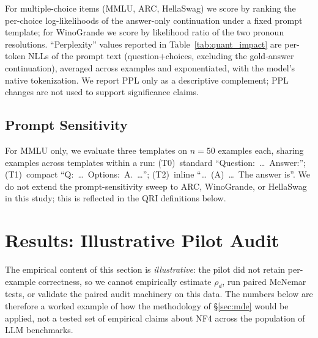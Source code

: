 \documentclass{article}
\begin{document}
For multiple-choice items (MMLU, ARC, HellaSwag) we score by ranking the per-choice log-likelihoods of the answer-only continuation under a fixed prompt template; for WinoGrande we score by likelihood ratio of the two pronoun resolutions. ``Perplexity'' values reported in Table~\ref{tab:quant_impact} are per-token NLLs of the prompt text (question$+$choices, excluding the gold-answer continuation), averaged across examples and exponentiated, with the model's native tokenization. We report PPL only as a descriptive complement; PPL changes are not used to support significance claims.

\subsection{Prompt Sensitivity}

For MMLU only, we evaluate three templates on $n{=}50$ examples each, sharing examples across templates within a run: (T0)~standard ``Question:~\ldots~Answer:''; (T1)~compact ``Q:~\ldots~Options:~A.~\ldots''; (T2)~inline ``\ldots~(A)~\ldots~The answer is''. We do not extend the prompt-sensitivity sweep to ARC, WinoGrande, or HellaSwag in this study; this is reflected in the QRI definitions below.

\section{Results: Illustrative Pilot Audit}
\label{sec:results}

The empirical content of this section is \emph{illustrative}: the pilot did not retain per-example correctness, so we cannot empirically estimate $\rho_d$, run paired McNemar tests, or validate the paired audit machinery on this data. The numbers below are therefore a worked example of how the methodology of §\ref{sec:mde} would be applied, not a tested set of empirical claims about NF4 across the population of LLM benchmarks.
\end{document}
